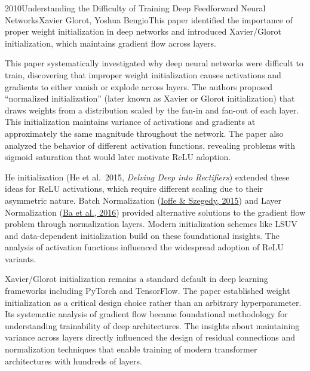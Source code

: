 
\begin{papersummary}{2010}{Understanding the Difficulty of Training Deep Feedforward Neural Networks}{Xavier Glorot, Yoshua Bengio}{This paper identified the importance of proper weight initialization in deep networks and introduced Xavier/Glorot initialization, which maintains gradient flow across layers.}

This paper systematically investigated why deep neural networks were difficult to train, discovering that improper weight initialization causes activations and gradients to either vanish or explode across layers. The authors proposed ``normalized initialization'' (later known as Xavier or Glorot initialization) that draws weights from a distribution scaled by the fan-in and fan-out of each layer. This initialization maintains variance of activations and gradients at approximately the same magnitude throughout the network. The paper also analyzed the behavior of different activation functions, revealing problems with sigmoid saturation that would later motivate ReLU adoption.

He initialization (He et al.\ 2015, \emph{Delving Deep into Rectifiers}) extended these ideas for ReLU activations, which require different scaling due to their asymmetric nature. Batch Normalization (\hyperref[paper:ioffe-szegedy-2015]{Ioffe \& Szegedy, 2015}) and Layer Normalization (\hyperref[paper:ba-2016]{Ba et al., 2016}) provided alternative solutions to the gradient flow problem through normalization layers. Modern initialization schemes like LSUV and data-dependent initialization build on these foundational insights. The analysis of activation functions influenced the widespread adoption of ReLU variants.

Xavier/Glorot initialization remains a standard default in deep learning frameworks including PyTorch and TensorFlow. The paper established weight initialization as a critical design choice rather than an arbitrary hyperparameter. Its systematic analysis of gradient flow became foundational methodology for understanding trainability of deep architectures. The insights about maintaining variance across layers directly influenced the design of residual connections and normalization techniques that enable training of modern transformer architectures with hundreds of layers.

\end{papersummary}
